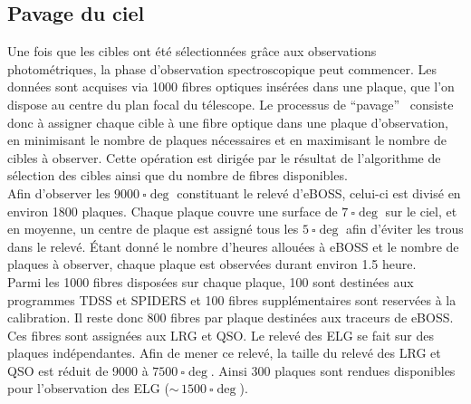 \subsection{Pavage du ciel}

Une fois que les cibles ont été sélectionnées grâce aux observations photométriques, la phase d'observation spectroscopique peut commencer. Les données sont acquises via \num{1000} fibres optiques insérées dans une plaque, que l'on dispose au centre du plan focal du télescope. 
Le processus de ``pavage''~\cite{Blanton2001} consiste donc à assigner chaque cible à une fibre optique dans une plaque d'observation, en minimisant le nombre de plaques nécessaires et en maximisant le nombre de cibles à observer. Cette opération est dirigée par le résultat de l'algorithme de sélection des cibles ainsi que du nombre de fibres disponibles. \\
Afin d'observer les $\SI{9000}{\square\deg}$ constituant le relevé d'eBOSS, celui-ci est divisé en environ \num{1800} plaques. Chaque plaque couvre une surface de $\SI{7}{\square\deg}$ sur le ciel, et en moyenne, un centre de plaque est assigné tous les $\SI{5}{\square\deg}$ afin d'éviter les trous dans le relevé. Étant donné le nombre d'heures allouées à eBOSS et le nombre de plaques à observer, chaque plaque est observées durant environ \num{1,5} heure. \\
Parmi les \num{1000} fibres disposées sur chaque plaque, \num{100} sont destinées aux programmes TDSS et SPIDERS et \num{100} fibres supplémentaires sont reservées à la calibration. Il reste donc \num{800} fibres par plaque destinées aux traceurs de eBOSS. Ces fibres sont assignées aux LRG et QSO. Le relevé des ELG se fait sur des plaques indépendantes. Afin de mener ce relevé, la taille du relevé des LRG et QSO est réduit de \num{9000} à $\SI{7500}{\square\deg}$. Ainsi \num{300} plaques sont rendues disponibles pour l'observation des ELG ($\sim\,\SI{1500}{\square\deg}$).


